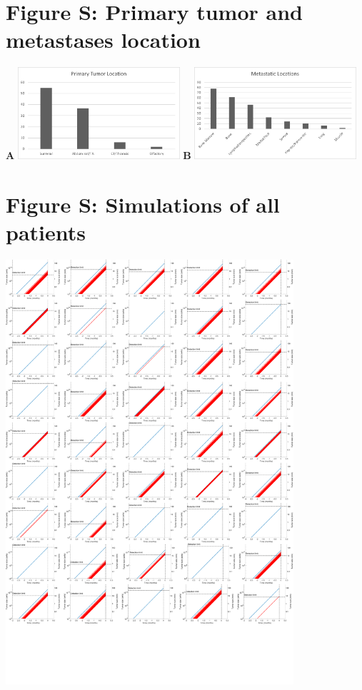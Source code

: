 \documentclass[11pt]{article}
\newcounter{fignb}  %
\begin{document}
\section{Figure S: Primary tumor and metastases location}
\spaceV
\begin{center}
\textbf{A}
\includegraphics[width=0.45\textwidth]{primary_location}
\textbf{B}
\includegraphics[width=0.45\textwidth]{metastatic_locations}
\end{center}
\newpage
{}
\section{Figure S: Simulations of all patients}
\spaceV
\begin{center}
\includegraphics[width=0.8\textwidth]{all_plots.png}
\end{center}
\end{document}
